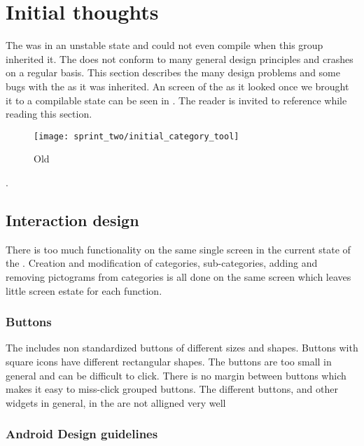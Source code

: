\section{Initial thoughts}

The \ct was in an unstable state and could not even compile when this group inherited it. The \ct does not conform to many general design principles and crashes on a regular basis. This section describes the many design problems and some bugs with the \ct as it was inherited. An screen of the \ct as it looked once we brought it to a compilable state can be seen in . The reader is invited to reference  while reading this section.

\begin{figure}[!htbp]
    \centering
    \texttt{[image: sprint\_two/initial\_category\_tool]}
    \caption{Old \ct}
    \label{fig:category_tool_old}
\end{figure}.

\subsection{Interaction design}

There is too much functionality on the same single screen in the current state of the \ct. Creation and modification of categories, sub-categories, adding and removing pictograms from categories is all done on the same screen which leaves little screen estate for each function.  

\subsubsection{Buttons}

The \ct includes non standardized buttons of different sizes and shapes. Buttons with square icons have different rectangular shapes. The buttons are too small in general and can be difficult to click. There is no margin between buttons which makes it easy to miss-click grouped buttons.   
The different buttons, and other widgets in general, in the \ct are not alligned very well



\subsubsection{Android Design guidelines}

